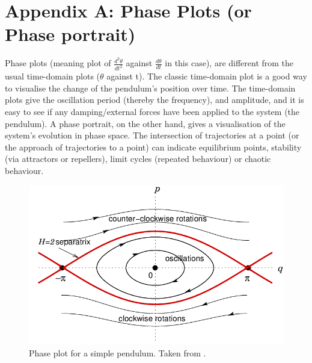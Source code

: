 \documentclass[10pt, twocolumn]{article}
\begin{document}
\section{Appendix A: Phase Plots (or Phase portrait)} \label{phase plots appendix}
Phase plots (meaning plot of $\frac{d^2\theta}{dt^2}$ against $\frac{d\theta}{dt}$ in this case), are different from the usual time-domain plots ($\theta$ against t). The classic time-domain plot is a good way to visualise the change of the pendulum's position over time. The time-domain plots give the oscillation period (thereby the frequency), and amplitude, and it is easy to see if any damping/external forces have been applied to the system (the pendulum). A phase portrait, on the other hand, gives a visualisation of the system's evolution in phase space. The intersection of trajectories at a point (or the approach of trajectories to a point) can indicate equilibrium points, stability (via attractors or repellers), limit cycles (repeated behaviour) or chaotic behaviour.
\begin{figure}[H]
    \centering
    \includegraphics[width = 0.7\columnwidth]{Projects/ForcedSimplePendulum/WrittenReport/figs/The-phase-space-of-the-simple-pendulum.png}
    \caption{Phase plot for a simple pendulum. Taken from \cite{Ball2007}.}
    \label{fig:enter-label}
\end{figure}
\end{document}
